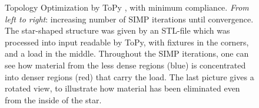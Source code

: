 \begin{figure}
\begin{subfigure}[c]{.24\linewidth}
\end{subfigure}
\caption{Topology Optimization by ToPy \cite{ToPy}, with minimum compliance. \emph{From left to right}: increasing number of SIMP iterations until convergence. The star-shaped structure was given by an STL-file which was processed into input readable by ToPy, with fixtures in the corners, and a load in the middle. Throughout the SIMP iterations, one can see how material from the less dense regions (blue) is concentrated into denser regions (red) that carry the load. The last picture gives a rotated view, to illustrate how material has been eliminated even from the inside of the star. } %
\label{fig: topyStar}
\end{figure}
